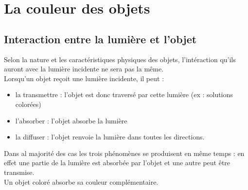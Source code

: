 \documentclass[a4paper,11pt,fleqn]{article}%
\begin{document}
    \section{La couleur des objets}
        \subsection{Interaction entre la lumière et l'objet}
        \begin{minipage}{.6\linewidth}
            Selon la nature et les caractéristiques physiques des objets, l'intéraction qu'ils auront avec la lumière incidente ne sera pas la même.\\
            Lorsqu'un objet reçoit  une lumière incidente, il peut :
            \begin{itemize}
                \item la transmettre :  l'objet est donc traversé par cette lumière (ex : solutions colorées)
                \item l'absorber : l'objet absorbe la lumière
                \item la diffuser : l'objet renvoie la lumière dans toutes les directions.
            \end{itemize}
            Dans al majorité des cas les trois phénomènes se produisent en même temps : en effet une partie de la lumière est absorbée par l'objet et une autre peut être transmise.\\
            Un objet coloré absorbe sa couleur complémentaire.
        \end{minipage}
        \begin{minipage}{.38\linewidth}
            \centering
            
        \end{minipage}
\end{document}
